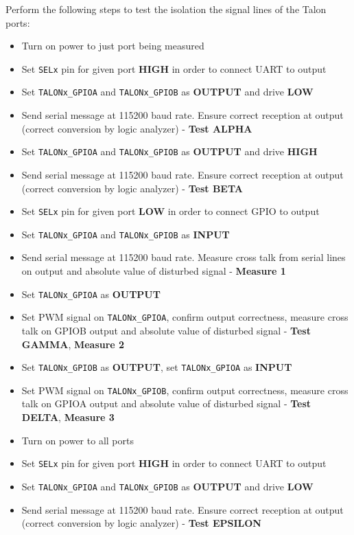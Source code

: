 Perform the following steps to test the isolation the signal lines of the Talon ports:
\begin{itemize}
\item Turn on power to just port being measured
\item Set \texttt{SELx} pin for given port \textbf{HIGH} in order to connect UART to output
\item Set \texttt{TALONx\_GPIOA} and \texttt{TALONx\_GPIOB} as \textbf{OUTPUT} and drive \textbf{LOW}
\item Send serial message at 115200 baud rate. Ensure correct reception at output (correct conversion by logic analyzer) - \textbf{Test ALPHA}
\item Set \texttt{TALONx\_GPIOA} and \texttt{TALONx\_GPIOB} as \textbf{OUTPUT} and drive \textbf{HIGH}
\item Send serial message at 115200 baud rate. Ensure correct reception at output (correct conversion by logic analyzer) - \textbf{Test BETA}
\item Set \texttt{SELx} pin for given port \textbf{LOW} in order to connect GPIO to output
\item Set \texttt{TALONx\_GPIOA} and \texttt{TALONx\_GPIOB} as \textbf{INPUT} 
\item Send serial message at 115200 baud rate. Measure cross talk from serial lines on output and absolute value of disturbed signal - \textbf{Measure 1}
\item Set \texttt{TALONx\_GPIOA} as \textbf{OUTPUT} 
\item Set PWM signal on \texttt{TALONx\_GPIOA}, confirm output correctness, measure cross talk on GPIOB output and absolute value of disturbed signal - \textbf{Test GAMMA}, \textbf{Measure 2}
\item Set \texttt{TALONx\_GPIOB} as \textbf{OUTPUT}, set \texttt{TALONx\_GPIOA} as \textbf{INPUT} 
\item Set PWM signal on \texttt{TALONx\_GPIOB}, confirm output correctness, measure cross talk on GPIOA output and absolute value of disturbed signal - \textbf{Test DELTA}, \textbf{Measure 3}
\item Turn on power to all ports 
\item Set \texttt{SELx} pin for given port \textbf{HIGH} in order to connect UART to output
\item Set \texttt{TALONx\_GPIOA} and \texttt{TALONx\_GPIOB} as \textbf{OUTPUT} and drive \textbf{LOW}
\item Send serial message at 115200 baud rate. Ensure correct reception at output (correct conversion by logic analyzer) - \textbf{Test EPSILON}

\end{itemize}

